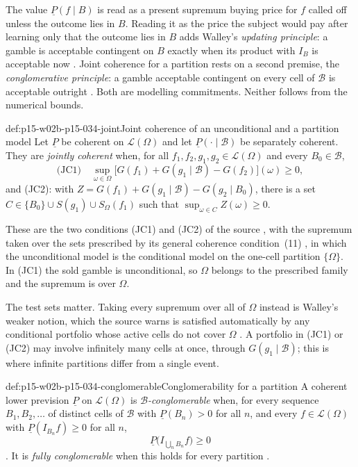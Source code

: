 The value \(\underline P(f\mid B)\) is read as a present supremum buying
price for \(f\) called off unless the outcome lies in \(B\). Reading it as
the price the subject would pay after learning only that the outcome lies in
\(B\) adds Walley's \emph{updating principle}: a gamble is acceptable
contingent on \(B\) exactly when its product with \(I_B\) is acceptable now
\cite[§3.1, p.~17]{MirandaCoherentLowerPrevisionsCapture}. Joint coherence
for a partition rests on a second premise, the \emph{conglomerative
principle}: a gamble acceptable contingent on every cell of
\(\mathcal B\) is acceptable outright
\cite[§3.2, p.~19]{MirandaCoherentLowerPrevisionsCapture}. Both are
modelling commitments. Neither follows from the numerical bounds.

\begin{hbdefinition}{def:p15-w02b-p15-034-joint}{Joint coherence of an unconditional and a partition model}
Let \(\underline P\) be coherent on \(\mathcal L(\Omega)\) and let
\(\underline P(\cdot\mid\mathcal B)\) be separately coherent. They are
\emph{jointly coherent} when, for all
\(f_1,f_2,g_1,g_2\in\mathcal L(\Omega)\) and every \(B_0\in\mathcal B\),
\[
 \text{(JC1)}\quad
 \sup_{\omega\in\Omega}\bigl[G(f_1)+G(g_1\mid\mathcal B)-G(f_2)\bigr](\omega)\geq0,
\]
and (JC2): with
\(Z=G(f_1)+G(g_1\mid\mathcal B)-G(g_2\mid B_0)\), there is a set
\(C\in\{B_0\}\cup S(g_1)\cup S_\Omega(f_1)\) such that
\(\sup_{\omega\in C}Z(\omega)\geq0\).

These are the two conditions (JC1) and (JC2) of the source
\cite[§3.3, p.~22]{MirandaCoherentLowerPrevisionsCapture}, with the
supremum taken over the sets prescribed by its general coherence
condition~(11) \cite[§3.2, p.~19]{MirandaCoherentLowerPrevisionsCapture},
in which the unconditional model is the conditional model on the one-cell
partition \(\{\Omega\}\). In (JC1) the sold gamble is unconditional, so
\(\Omega\) belongs to the prescribed family and the supremum is over
\(\Omega\).
\end{hbdefinition}

The test sets matter. Taking every supremum over all of \(\Omega\) instead
is Walley's weaker notion, which the source warns is satisfied
automatically by any conditional portfolio whose active cells do not cover
\(\Omega\) \cite[Remark~1, p.~20]{MirandaCoherentLowerPrevisionsCapture}.
A portfolio in (JC1) or (JC2) may involve infinitely many cells at once,
through \(G(g_1\mid\mathcal B)\); this is where infinite partitions differ
from a single event.

\begin{hbdefinition}{def:p15-w02b-p15-034-conglomerable}{Conglomerability for a partition}
A coherent lower prevision \(\underline P\) on \(\mathcal L(\Omega)\)
is \emph{\(\mathcal B\)-conglomerable} when, for every sequence
\(B_1,B_2,\ldots\) of distinct cells of \(\mathcal B\) with
\(\underline P(B_n)>0\) for all \(n\), and every
\(f\in\mathcal L(\Omega)\) with \(\underline P(I_{B_n}f)\geq0\) for all
\(n\),
\[
             \underline P\bigl(I_{\bigcup_nB_n}f\bigr)\geq0
\]
\cite[§3.3, p.~23]{MirandaCoherentLowerPrevisionsCapture}.
It is \emph{fully conglomerable} when this holds for every partition
\cite[p.~24]{MirandaCoherentLowerPrevisionsCapture}.
\end{hbdefinition}

